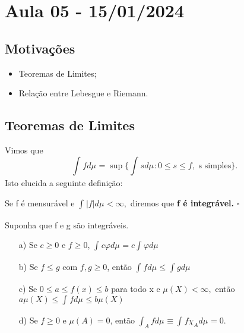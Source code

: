 \documentclass[MeasureTheory/measure_theory.tex]{subfiles}
\begin{document}
\section{Aula 05 - 15/01/2024}
\subsection{Motivações}
\begin{itemize}
	\item Teoremas de Limites;
	\item Relação entre Lebesgue e Riemann.
\end{itemize}
\subsection{Teoremas de Limites}
Vimos que
\[
	\int_{}f d\mu_{} = \sup_{}\biggl\{\int_{}s d\mu_{}: 0 \leq s\leq f, \text{ s simples}\biggr\}.
\]
Isto elucida a seguinte definição:
\begin{def*}
	Se f é mensurável e \(\int_{}|f| d\mu_{} < \infty,\) diremos que \textbf{f é integrável.} \(\square\)
\end{def*}
\begin{prop*}
	Suponha que f e g são integráveis.
	\begin{itemize}
		\item[a)] Se \(c \geq 0\) e \(f\geq 0\), \(\int_{}c\varphi  d\mu_{} = c \int_{}\varphi d\mu_{}\)
		\item[b)] Se \(f\leq g\) com \(f, g \geq 0\), então \(\int_{}f d\mu_{} \leq \int_{}g d\mu_{}\)
		\item[c)] Se \(0\leq a\leq f(x)\leq b\) para todo x e \(\mu (X) < \infty,\) então \(a\mu (X) \leq \int_{}f d\mu_{} \leq b\mu (X)\)
		\item[d)] Se \(f\geq 0\) e \(\mu (A) = 0\), então \(\int_{A}f d\mu_{}\equiv \int_{}f \chi_{A} d\mu_{} = 0.\)
	\end{itemize}
\end{prop*}
\end{document}
